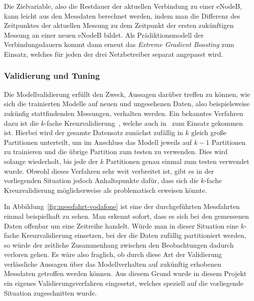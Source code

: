 Die Zielvariable, also die Restdauer der aktuellen Verbindung zu einer eNodeB, kann leicht aus den Messdaten berechnet werden,
indem man die Differenz des Zeitpunktes der aktuellen Messung zu dem Zeitpunkt der ersten zuk\"unftigen Messung an einer neuen
eNodeB bildet. Als Pr\"adiktionsmodell der Verbindungsdauern kommt dann erneut das \textit{Extreme Gradient Boosting} zum Einsatz,
welches f\"ur jeden der drei Netzbetreiber separat angepasst wird.

\subsubsection{Validierung und Tuning}
\label{sec:validierung-tuning}

Die Modellvalidierung erf\"ullt den Zweck, Aussagen dar\"uber treffen zu k\"onnen, wie sich die trainierten Modelle
auf neuen und ungesehenen Daten, also beispielsweise zuk\"unfig stattfindenden Messungen, 
verhalten werden.
Ein bekanntes Verfahren dazu ist die $k$-fache Kreuzvalidierung~\cite{elements}, welche auch in~\cite{IEEE} zum Einsatz
gekommen ist.
Hierbei wird der gesamte Datensatz zun\"achst zuf\"allig in $k$ gleich gro{\ss}e Partitionen unterteilt,
um im Anschluss das Modell jeweils auf $k-1$ Partitionen
zu trainieren und die \"ubrige Partition zum testen zu verwenden. Dies wird solange wiederholt, bis jede der
$k$ Partitionen genau einmal zum testen verwendet wurde.
Obwohl dieses Verfahren sehr weit verbreitet ist, gibt es in der vorliegenden Situation jedoch Anhaltspunkte daf\"ur,
dass sich die $k$-fache Kreuzvalidierung m\"oglicherweise als problematisch erweisen k\"onnte.

In Abbildung~\ref{fig:messfahrt-vodafone} ist eine der durchgef\"uhrten Messfahrten einmal beispielhaft zu sehen.
Man erkennt sofort, dass es sich bei den gemessenen Daten offenbar um eine Zeitreihe handelt.
W\"urde man in dieser Situation eine $k$-fache Kreuzvalidierung einsetzen, bei der die Daten zuf\"allig partitioniert werden,
so w\"urde der zeitliche Zusammenhang zwischen den Beobachtungen dadurch verloren gehen.
Es w\"are also fraglich, ob durch diese Art der Validierung verl\"assliche Aussagen \"uber das Modellverhalten auf zuk\"unftig
erhobenen Messdaten getroffen werden k\"onnen.
Aus diesem Grund wurde in diesem Projekt ein eigenes Validierungsverfahren eingesetzt, welches speziell auf die vorliegende Situation
zugeschnitten wurde.


